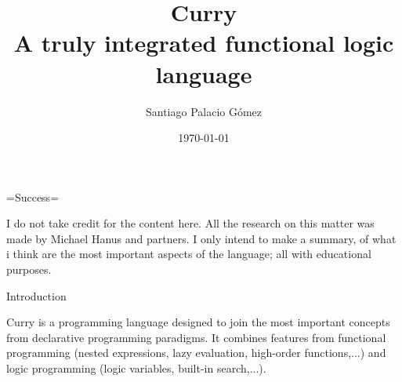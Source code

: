 \documentclass{beamer}
\title{Curry\\ A truly integrated functional logic language}
\author{Santiago Palacio Gómez}
\institute{Universidad EAFIT}
\date{\today}
\begin{document}
=Success=
\begin{frame}
  \titlepage
\end{frame}

\begin{frame}
  I do not take credit for the content here. All the research on this matter was made by Michael Hanus and partners. I only intend to make a summary, of what i think are the most important aspects of the language; all with educational purposes.
\end{frame}
\begin{frame}[allowframebreaks]
  \tableofcontents
\end{frame}


\begin{section}{Introduction}
  
  \begin{frame}
    Curry is a programming language designed to join the most important
    concepts
    from declarative programming paradigms. It combines features from
    functional
    programming (nested expressions, lazy evaluation, high-order
    functions,...) and
    logic programming (logic variables, built-in search,...).
  \end{frame}
\end{section}
\end{document}
